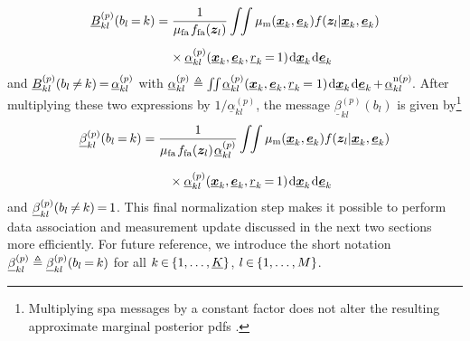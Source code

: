 \documentclass[10pt, twoside, romanappendices]{IEEEtran}
\providecommand{\ist}{\hspace*{.3mm}}
\providecommand{\rmv}{\hspace*{-.3mm}}
\providecommand{\nn}{\nonumber}
\begin{document}
\begin{align}
\underline{B}_{kl}^{(p)}(b_{l} \rmv=\rmv k)  &= \frac{1}{\mu_{\mathrm{fa}} \ist f_{\mathrm{fa}}(\V{z}_{l})}  \int \rmv\rmv\rmv\rmv \int \mu_{\mathrm{m}}(\underline{\V{x}}_k,\underline{\V{e}}_k)  f(\V{z}_{l}| \underline{\V{x}}_k, \underline{\V{e}}_{k})\nn\\[1.8mm]
&\hspace{4mm}\times  \underline{\alpha}_{kl}^{(p)}(\underline{\V{x}}_{k}, \underline{\V{e}}_{k}, \underline{r}_{k} \rmv=\rmv 1) \ist \mathrm{d} \underline{\V{x}}_{k} \ist \mathrm{d} \underline{\V{e}}_{k}\label{eq:Beta1c} \end{align}
and $\underline{B}_{kl}^{(p)}(b_{l} \rmv\neq\rmv k) \rmv = \rmv \underline{\alpha}_{kl}^{(p)}$ with $\underline{\alpha}_{kl}^{(p)} \triangleq \int \rmv\rmv\rmv\rmv \int \rmv \underline{\alpha}_{kl}^{(p)}(\underline{\V{x}}_{k}, \underline{\V{e}}_{k}, \underline{r}_{k} \rmv= 1) \ist \mathrm{d} \underline{\V{x}}_{k} \ist \mathrm{d} \underline{\V{e}}_{k} \rmv+\rmv \underline{\alpha}^{\mathrm{n}(p)}_{kl}\rmv$.
After multiplying these two expressions by $1/\underline{\alpha}_{kl}^{(p)} $, the message $\underline{\beta}_{kl}^{(p)}(b_{l})$ is given by\footnote{Multiplying \ac{spa} messages by a constant factor does not alter the resulting approximate marginal posterior \acp{pdf} \cite{KscFreLoe:01}.}
\begin{align}
\underline{\beta}_{kl}^{(p)}(b_{l} \rmv=\rmv k)  &= \frac{1}{\mu_{\mathrm{fa}} \ist f_{\mathrm{fa}}(\V{z}_{l}) \ist \underline{\alpha}_{kl}^{(p)} }  \int \rmv\rmv\rmv\rmv \int \mu_{\mathrm{m}}(\underline{\V{x}}_k,\underline{\V{e}}_k)  f(\V{z}_{l}| \underline{\V{x}}_k, \underline{\V{e}}_{k})\nn\\[2.5mm]
&\hspace{7.5mm}\times  \underline{\alpha}_{kl}^{(p)}(\underline{\V{x}}_{k}, \underline{\V{e}}_{k}, \underline{r}_{k} \rmv=\rmv 1) \ist \mathrm{d} \underline{\V{x}}_{k} \ist \mathrm{d} \underline{\V{e}}_{k}\label{eq:Beta1b}
\end{align}
and $\underline{\beta}_{kl}^{(p)}(b_{l} \rmv\neq\rmv k) \rmv=\rmv 1$. This final normalization step makes it possible to perform data association and measurement update discussed in the next two sections more efficiently. For future reference, we introduce the short notation $\underline{\beta}_{kl}^{(p)} \triangleq \underline{\beta}_{kl}^{(p)}(b_{l} \rmv=\rmv k) $ for all $k \rmv\in\rmv \{1,\dots,\underline{K}\}$, $l \rmv\in\rmv \{1,\dots,M\}$.
\end{document}
